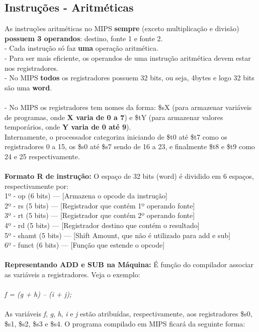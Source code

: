 \documentclass[12pt]{article}
\begin{document}
    \subsection{Instruções - Aritméticas}
    As instruções aritméticas no MIPS \textbf{sempre} (exceto multiplicação e divisão) \textbf{possuem 3 operandos}: destino, fonte 1 e fonte 2.
    \\- Cada instrução só faz \textbf{uma} operação aritmética.
    \\- Para ser mais eficiente, os operandos de uma instrução aritmética devem estar nos registradores.
    \\- No MIPS \textbf{todos} os registradores possuem 32 bits, ou seja, 4bytes e logo 32 bits são uma \textbf{word}.
    \\~\\- No MIPS os registradores tem nomes da forma: \$sX (para armazenar variáveis de programas, onde \textbf{X varia de 0 a 7}) e \$tY (para armazenar valores temporários, onde \textbf{Y varia de 0 até 9}).
    \\Internamente, o processador categoriza iniciando de \$t0 até \$t7 como os registradores 0 a 15, os \$s0 até \$s7 sendo de 16 a 23, e finalmente \$t8 e \$t9 como 24 e 25 respectivamente.
    \\~\\\textbf{Formato R de instrução:} O espaço de 32 bits (word) é dividido em 6 espaços, respectivamente por:
    \\1º - op (6 bits) --- [Armazena o opcode da instrução]
    \\2º - rs (5 bits) --- [Registrador que contém 1º operando fonte]
    \\3º - rt (5 bits) --- [Registrador que contém 2º operando fonte]
    \\4º - rd (5 bits)  --- [Registrador destino que contém o resultado]
    \\5º - shamt (5 bits)  --- [Shift Amount, que não é utilizado para add e sub]
    \\6º - funct (6 bits) --- [Função que estende o opcode]
    \\~\\\textbf{Representando ADD e SUB na Máquina:} É função do compilador associar as variáveis a registradores. Veja o exemplo:
    \\~\\\textit{f = (g + h) – (i + j);}
    \\~\\ As variáveis \textit{f}, \textit{g}, \textit{h}, \textit{i} e \textit{j} estão atribuídas, respectivamente, aos registradores  \$s0, \$s1, \$s2, \$s3 e \$s4. O programa compilado em MIPS ficará da seguinte forma:
\end{document}
